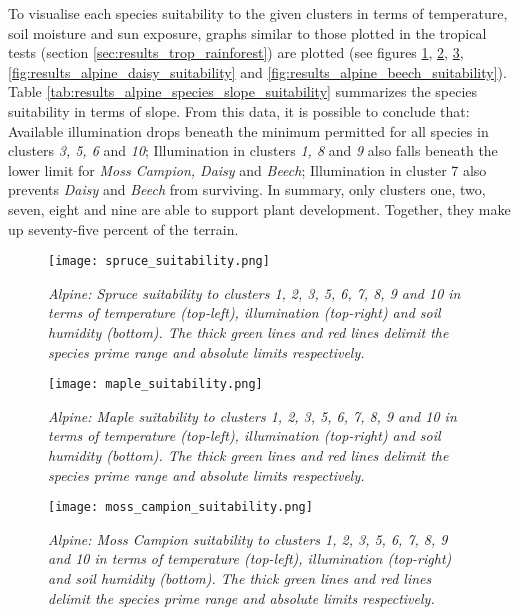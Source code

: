 To visualise each species suitability to the given clusters in terms of temperature, soil moisture and sun exposure, graphs similar to those plotted in the tropical tests (section \ref{sec:results_trop_rainforest}) are plotted (see figures \ref{fig:results_alpine_spruce_suitability}, \ref{fig:results_alpine_maple_suitability}, \ref{fig:results_alpine_moss_campion_suitability}, \ref{fig:results_alpine_daisy_suitability} and \ref{fig:results_alpine_beech_suitability}). Table \ref{tab:results_alpine_species_slope_suitability} summarizes the species suitability in terms of slope. From this data, it is possible to conclude that: Available illumination drops beneath the minimum permitted for all species in clusters \textit{3, 5, 6} and \textit{10}; Illumination in clusters \textit{1, 8} and \textit{9} also falls beneath the lower limit for \textit{Moss Campion, Daisy} and \textit{Beech}; Illumination in cluster 7 also prevents \textit{Daisy} and \textit{Beech} from surviving. In summary, only clusters one, two, seven, eight and nine are able to support plant development. Together, they make up seventy-five percent of the terrain.\\

\begin{figure}[htb!]
\center
	\texttt{[image: spruce\_suitability.png]}
	\caption{ \textit{Alpine: Spruce suitability to clusters 1, 2, 3, 5, 6, 7, 8, 9 and 10 in terms of temperature (top-left), illumination (top-right) and soil humidity (bottom). The thick green lines and red lines delimit the species prime range and absolute limits respectively.}}
	\label{fig:results_alpine_spruce_suitability}
\end{figure}

\begin{figure}[htb!]
\center
	\texttt{[image: maple\_suitability.png]}
	\caption{ \textit{Alpine: Maple suitability to clusters 1, 2, 3, 5, 6, 7, 8, 9 and 10 in terms of temperature (top-left), illumination (top-right) and soil humidity (bottom). The thick green lines and red lines delimit the species prime range and absolute limits respectively.}}
	\label{fig:results_alpine_maple_suitability}
\end{figure}

\begin{figure}[htb!]
\center
	\texttt{[image: moss\_campion\_suitability.png]}
	\caption{ \textit{Alpine: Moss Campion suitability to clusters 1, 2, 3, 5, 6, 7, 8, 9 and 10 in terms of temperature (top-left), illumination (top-right) and soil humidity (bottom). The thick green lines and red lines delimit the species prime range and absolute limits respectively.}}
	\label{fig:results_alpine_moss_campion_suitability}
\end{figure}

